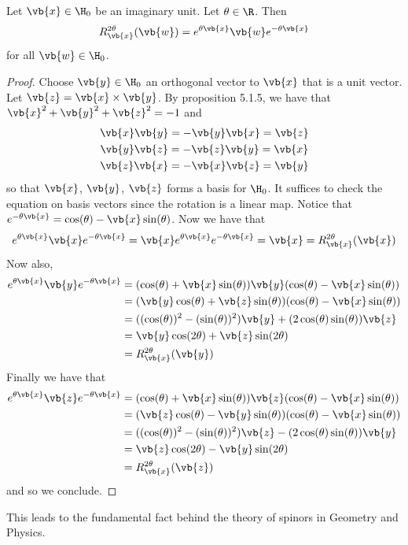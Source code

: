 \documentclass[a4paper]{article}
\begin{document}
\begin{lmm}{}{} Let $\vb{x}\in\H_0$ be an imaginary unit. Let $\theta\in\R$. Then $$R_{\vb{x}}^{2\theta}(\vb{w})=e^{\theta\vb{x}}\vb{w}e^{-\theta\vb{x}}$$ for all $\vb{w}\in\H_0$. 
\begin{proof}
Choose $\vb{y}\in\H_0$ an orthogonal vector to $\vb{x}$ that is a unit vector. Let $\vb{z}=\vb{x}\times\vb{y}$. By proposition 5.1.5, we have that $\vb{x}^2+\vb{y}^2+\vb{z}^2=-1$ and \begin{gather*}
\vb{x}\vb{y}=-\vb{y}\vb{x}=\vb{z}\\
\vb{y}\vb{z}=-\vb{z}\vb{y}=\vb{x}\\
\vb{z}\vb{x}=-\vb{x}\vb{z}=\vb{y}
\end{gather*} so that $\vb{x}$, $\vb{y}$, $\vb{z}$ forms a basis for $\H_0$. 
It suffices to check the equation on basis vectors since the rotation is a linear map. Notice that $e^{-\theta\vb{x}}=\cos(\theta)-\vb{x}\sin(\theta)$. Now we have that $$
e^{\theta\vb{x}}\vb{x}e^{-\theta\vb{x}}=\vb{x}e^{\theta\vb{x}}e^{-\theta\vb{x}}=\vb{x}=R_{\vb{x}}^{2\theta}(\vb{x})$$ Now also, 
\begin{align*}
e^{\theta\vb{x}}\vb{y}e^{-\theta\vb{x}}&=(\cos(\theta)+\vb{x}\sin(\theta))\vb{y}(\cos(\theta)-\vb{x}\sin(\theta))\\
&=(\vb{y}\cos(\theta)+\vb{z}\sin(\theta))(\cos(\theta)-\vb{x}\sin(\theta))\\
&=((\cos(\theta))^2-(\sin(\theta))^2)\vb{y}+(2\cos(\theta)\sin(\theta))\vb{z}\\
&=\vb{y}\cos(2\theta)+\vb{z}\sin(2\theta)\\
&=R_{\vb{x}}^{2\theta}(\vb{y})
\end{align*} Finally we have that 
\begin{align*}
e^{\theta\vb{x}}\vb{z}e^{-\theta\vb{x}}&=(\cos(\theta)+\vb{x}\sin(\theta))\vb{z}(\cos(\theta)-\vb{x}\sin(\theta))\\
&=(\vb{z}\cos(\theta)-\vb{y}\sin(\theta))(\cos(\theta)-\vb{x}\sin(\theta))\\
&=((\cos(\theta))^2-(\sin(\theta))^2)\vb{z}-(2\cos(\theta)\sin(\theta))\vb{y}\\
&=\vb{z}\cos(2\theta)-\vb{y}\sin(2\theta)\\
&=R_{\vb{x}}^{2\theta}(\vb{z})
\end{align*}
and so we conclude. 
\end{proof}
\end{lmm}

This leads to the fundamental fact behind the theory of spinors in Geometry and Physics. 
\end{document}
